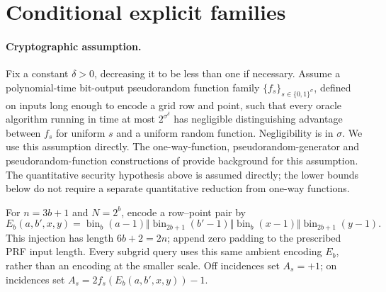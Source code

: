 \section{Conditional explicit families}\label{sec:explicit}\label{sec:prf}
\paragraph{Cryptographic assumption.}
Fix a constant $\delta>0$, decreasing it to be less than one if necessary. Assume a polynomial-time bit-output pseudorandom function family $\{f_s\}_{s\in\{0,1\}^\sigma}$, defined on inputs long enough to encode a grid row and point, such that every oracle algorithm running in time at most $2^{\sigma^\delta}$ has negligible distinguishing advantage between $f_s$ for uniform $s$ and a uniform random function. Negligibility is in $\sigma$. We use this assumption directly. The one-way-function, pseudorandom-generator and pseudorandom-function constructions of \citet{HILL99,GGM86} provide background for this assumption. The quantitative security hypothesis above is assumed directly; the lower bounds below do not require a separate quantitative reduction from one-way functions.

For $n=3b+1$ and $N=2^b$, encode a row--point pair by
\[
 E_b(a,b',x,y)=\operatorname{bin}_{b}(a-1)\Vert
 \operatorname{bin}_{2b+1}(b'-1)\Vert
 \operatorname{bin}_{b}(x-1)\Vert
 \operatorname{bin}_{2b+1}(y-1).
\]
This injection has length $6b+2=2n$; append zero padding to the prescribed PRF input length. Every subgrid query uses this same ambient encoding $E_b$, rather than an encoding at the smaller scale. Off incidences set $A_s=+1$; on incidences set $A_s=2f_s(E_b(a,b',x,y))-1$.

